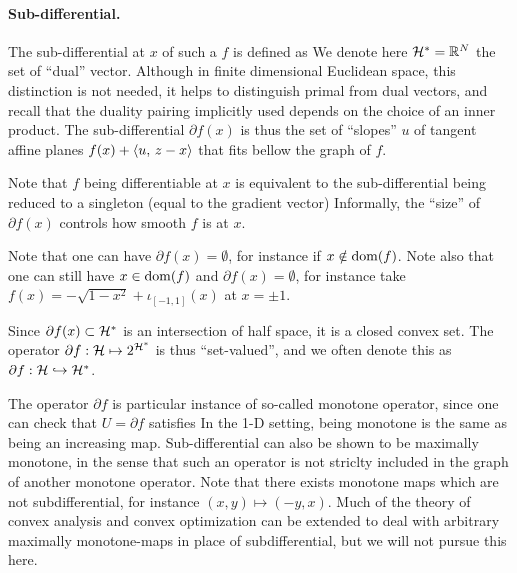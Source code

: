 \paragraph{Sub-differential.}

The sub-differential at $x$ of such a $f$ is defined as
We denote here $\mathcal{H}^* = \mathbb{R}^N$ the set of ``dual'' vector. Although in finite dimensional Euclidean space, this distinction is not needed, it helps to distinguish primal from dual vectors, and recall that the duality pairing implicitly used depends on the choice of an inner product.
%
The sub-differential $\partial f(x)$ is thus the set of ``slopes'' $u$ of tangent affine planes $f(x) + \langle u,\,z-x\rangle$ that fits bellow the graph of $f$. 


Note that $f$ being differentiable at $x$ is equivalent to the sub-differential being reduced to a singleton (equal to the gradient vector)
Informally, the ``size'' of $\partial f(x)$ controls how smooth $f$ is at $x$.

Note that one can have $\partial f(x) = \emptyset$, for instance if $x \notin \operatorname{dom}(f)$. Note also that one can still have $x \in \operatorname{dom}(f)$ and $\partial f(x) = \emptyset$, for instance take $f(x)=-\sqrt{1-x^2} + \iota_{[-1,1]}(x)$ at $x=\pm 1$. 

Since $\partial f(x) \subset \mathcal{H}^*$ is an intersection of half space, it is a closed convex set.
%
The operator $\partial f : \mathcal{H} \mapsto 2^{\mathcal{H}^*}$ is thus ``set-valued'', and we often denote this as $\partial f : \mathcal{H} \hookrightarrow \mathcal{H}^*$.

\begin{rem}
The operator $\partial f$ is particular instance of so-called monotone operator, since one can check that $U=\partial f$ satisfies 
In the 1-D setting, being monotone is the same as being an increasing map.
%
Sub-differential can also be shown to be maximally monotone, in the sense that such an operator is not striclty included in the graph of another monotone operator. 
%
Note that there exists monotone maps which are not subdifferential, for instance $(x,y) \mapsto (-y,x)$. 
% 
Much of the theory of convex analysis and convex optimization can be extended to deal with arbitrary maximally monotone-maps in place of subdifferential, but we will not pursue this here.
\end{rem}

